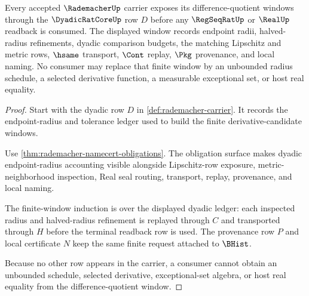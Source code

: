 \begin{theorem}
\label{thm:rademacher-dyadic-difference-quotient-obligation}
Every accepted $\RademacherUp$ carrier exposes its difference-quotient windows through the $\DyadicRatCoreUp$ row $D$ before any $\RegSeqRatUp$ or $\RealUp$ readback is consumed. The displayed window records endpoint radii, halved-radius refinements, dyadic comparison budgets, the matching Lipschitz and metric rows, $\hsame$ transport, $\Cont$ replay, $\Pkg$ provenance, and local naming. No consumer may replace that finite window by an unbounded radius schedule, a selected derivative function, a measurable exceptional set, or host real equality.
\end{theorem}
\begin{proof}
Start with the dyadic row $D$ in \autoref{def:rademacher-carrier}. It records the endpoint-radius and tolerance ledger used to build the finite derivative-candidate windows.

Use \autoref{thm:rademacher-namecert-obligations}. The obligation surface makes dyadic endpoint-radius accounting visible alongside Lipschitz-row exposure, metric-neighborhood inspection, Real seal routing, transport, replay, provenance, and local naming.

The finite-window induction is over the displayed dyadic ledger: each inspected radius and halved-radius refinement is replayed through $C$ and transported through $H$ before the terminal readback row is used. The provenance row $P$ and local certificate $N$ keep the same finite request attached to $\BHist$.

Because no other row appears in the carrier, a consumer cannot obtain an unbounded schedule, selected derivative, exceptional-set algebra, or host real equality from the difference-quotient window.
\end{proof}

